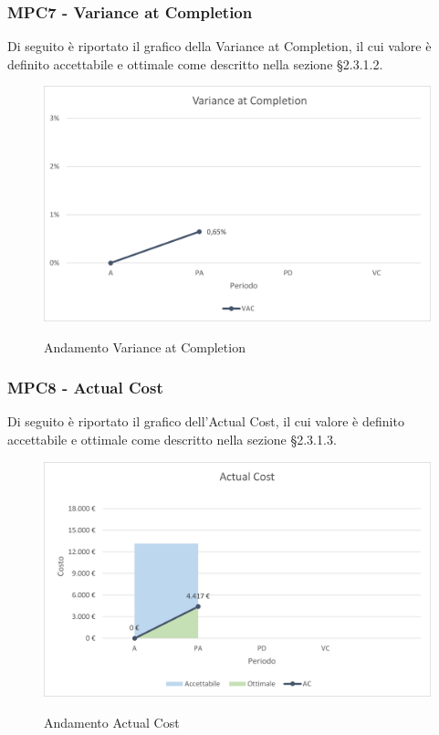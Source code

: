 \subsubsection{MPC7 - Variance at Completion}
Di seguito è riportato il grafico della Variance at Completion, il cui valore è definito accettabile e ottimale come descritto nella sezione §2.3.1.2.\\

\begin{figure}[H]
\centering
\includegraphics[scale=0.78]{res/ResocontoAttivitaDiVerifica/res/metriche/grafici/img/varianceCompletion.png}\\
\caption{Andamento Variance at Completion}
\end{figure}

\subsubsection{MPC8 - Actual Cost}
Di seguito è riportato il grafico dell'Actual Cost, il cui valore è definito accettabile e ottimale come descritto nella sezione §2.3.1.3.\\

\begin{figure}[H]
\centering
\includegraphics[scale=0.78]{res/ResocontoAttivitaDiVerifica/res/metriche/grafici/img/actualCost.png}\\
\caption{Andamento Actual Cost}
\end{figure}

